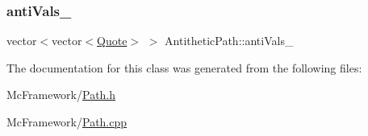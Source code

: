\subsubsection{\texorpdfstring{anti\+Vals\+\_\+}{antiVals\_}}
{\footnotesize\ttfamily vector$<$vector$<$\hyperlink{_name_def_8h_a642a6c5fd87319d922637de0e0bb0305}{Quote}$>$ $>$ Antithetic\+Path\+::anti\+Vals\+\_\+\hspace{0.3cm}{\ttfamily [private]}}



The documentation for this class was generated from the following files\+:\begin{DoxyCompactItemize}
\item 
Mc\+Framework/\hyperlink{_path_8h}{Path.\+h}\item 
Mc\+Framework/\hyperlink{_path_8cpp}{Path.\+cpp}\end{DoxyCompactItemize}

